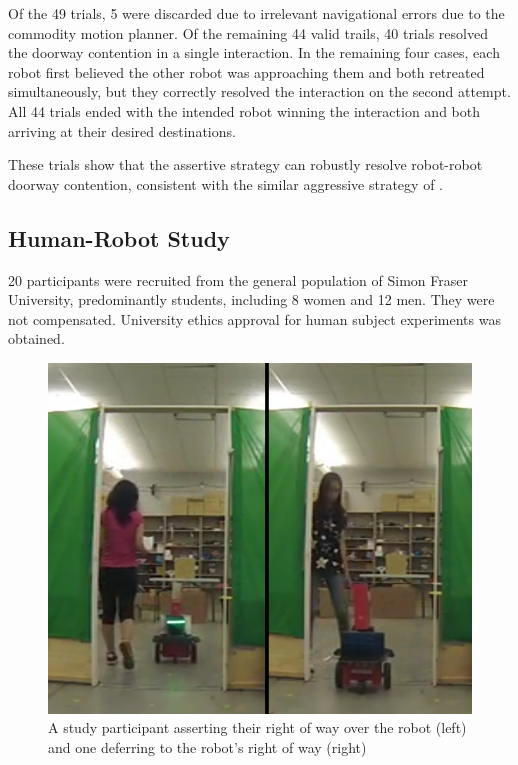 \documentclass[letterpaper, 10 pt, conference]{ieeeconf}  %
\begin{document}
Of the 49 trials, 5 were discarded due to irrelevant navigational errors due to the commodity motion planner. Of the remaining 44 valid trails, 40 trials resolved the doorway contention in a single interaction. In the remaining four cases, each robot first believed the other robot was approaching them and both retreated simultaneously, but they correctly resolved the interaction on the second attempt. All 44 trials ended with the intended robot winning the interaction and both arriving at their desired destinations.

These trials show that the assertive strategy can robustly resolve robot-robot doorway contention, consistent with the similar aggressive strategy of \cite{zuluaga2005reducing}. 

\subsection{Human-Robot Study}
20 participants were recruited from the general population of Simon Fraser University, predominantly students, including 8 women and 12 men. They were not compensated. University ethics approval for human subject experiments was obtained. 

     \begin{figure}
      \centering
      \includegraphics[width=\columnwidth]{test_example_c.png}
      \caption{A study participant asserting their right of way over the robot (left) and one deferring to the robot's right of way (right)}
      \label{fig:Example}
   \end{figure}
\end{document}
